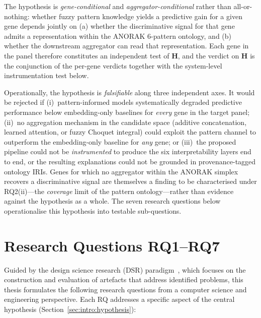 The hypothesis is \emph{gene-conditional} and
\emph{aggregator-conditional} rather than all-or-nothing: whether
fuzzy pattern knowledge yields a predictive gain for a given gene
depends jointly on (a) whether the discriminative signal for that
gene admits a representation within the ANORAK 6-pattern ontology,
and (b) whether the downstream aggregator can read that
representation.
Each gene in the panel therefore constitutes an independent test of
\textbf{H}, and the verdict on \textbf{H} is the conjunction of the
per-gene verdicts together with the system-level instrumentation
test below.

Operationally, the hypothesis is \emph{falsifiable} along three
independent axes.
It would be rejected if
(i)~pattern-informed models systematically degraded predictive
performance below embedding-only baselines for \emph{every} gene in
the target panel;
(ii)~no aggregation mechanism in the candidate space (additive
concatenation, learned attention, or fuzzy Choquet integral) could
exploit the pattern channel to outperform the embedding-only
baseline for \emph{any} gene;
or (iii)~the proposed pipeline could not be \emph{instrumented} to
produce the six interpretability layers end to end, or the
resulting explanations could not be grounded in provenance-tagged
ontology IRIs.
Genes for which no aggregator within the ANORAK simplex recovers a
discriminative signal are themselves a finding to be characterised
under RQ2(ii)---the \emph{coverage} limit of the pattern
ontology---rather than evidence against the hypothesis as a whole.
The seven research questions below operationalise this hypothesis
into testable sub-questions.

\section{Research Questions RQ1--RQ7}
\label{sec:intro:rq}

Guided by the design science research (DSR) paradigm~\cite{hevner2004design, peffers2007dsrm}, which focuses on the construction and evaluation of artefacts that address identified problems, this thesis formulates the following research questions from a computer science and engineering perspective.
Each RQ addresses a specific aspect of the central hypothesis (Section~\ref{sec:intro:hypothesis}):

